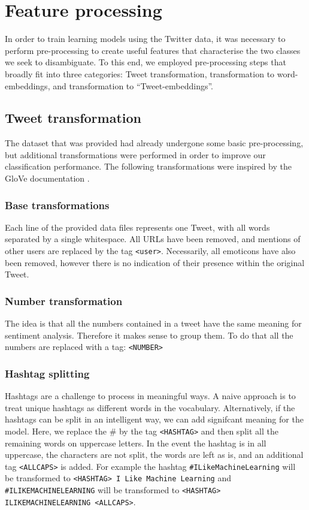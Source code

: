 \section{Feature processing}
\label{sec:processing}
In order to train learning models using the Twitter data, it was necessary to perform pre-processing to create useful features that characterise the two classes we seek to disambiguate. To this end, we employed pre-processing steps that broadly fit into three categories: Tweet transformation, transformation to word-embeddings, and transformation to ``Tweet-embeddings''.

\subsection{Tweet transformation}
The dataset that was provided had already undergone some basic pre-processing, but additional transformations were performed in order to improve our classification performance. The following transformations were inspired by the GloVe documentation \cite{glove}.

\subsubsection{Base transformations}
Each line of the provided data files represents one Tweet, with all words separated by a single whitespace. All URLs have been removed, and mentions of other users are replaced by the tag \texttt{<user>}. Necessarily, all emoticons have also been removed, however there is no indication of their presence within the original Tweet.

\subsubsection{Number transformation}
The idea is that all the numbers contained in a tweet have the same meaning for sentiment analysis. Therefore it makes sense to group them. To do that all the numbers are replaced with a tag: \texttt{<NUMBER>}

\subsubsection{Hashtag splitting}
Hashtags are a challenge to process in meaningful ways. A naive approach is to treat unique hashtags as different words in the vocabulary. Alternatively, if the hashtags can be split in an intelligent way, we can add signifcant meaning for the model.  Here, we replace the \# by the tag \texttt{<HASHTAG>} and then split all the remaining words on uppercase letters. In the event the hashtag is in all uppercase, the characters are not split, the words are left as is, and an additional tag \texttt{<ALLCAPS>} is added. For example the hashtag \texttt{\#ILikeMachineLearning} will be transformed to \texttt{<HASHTAG> I Like Machine Learning} and \texttt{\#ILIKEMACHINELEARNING} will be transformed to \texttt{<HASHTAG> ILIKEMACHINELEARNING <ALLCAPS>}. 


